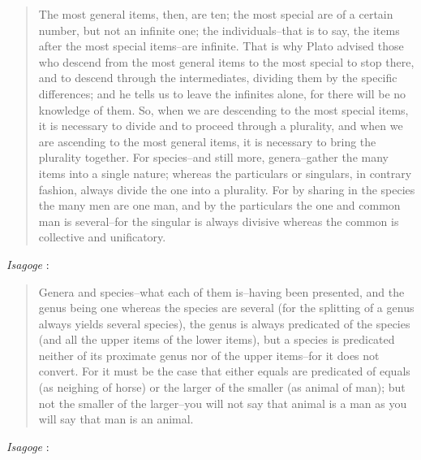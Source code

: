 \documentclass{article}
\begin{document}
\begin{quote}
The most general items, then, are ten; the most special are of a certain number, but not an infinite one; the individuals--that is to say, the items after the most special items--are infinite.
That is why Plato advised those who descend from the most general items to the most special to stop there, and to descend through the intermediates, dividing them by the specific differences; and he tells us to leave the infinites alone, for there will be no knowledge of them. So, when we are descending to the most special items, it is necessary to divide and to 
proceed through a plurality, and when we are ascending to the most general items, it is necessary to bring the plurality together. For species--and still more, genera--gather the many
items into a single nature; whereas the particulars or singulars, in contrary fashion, always divide the one into a plurality. For by sharing in the species the many men are one man, and by the particulars the one and common man is several--for the singular is always divisive whereas the common is collective and unificatory.
\end{quote}


{\em Isagoge} \cite[pp.~7--8, \S 2]{isagoge}:

\begin{quote}
Genera and species--what each of them is--having been presented, and the genus being one whereas the species are several (for the splitting of a genus always yields several species), the genus is always predicated of the species (and all the upper items of the lower items), but a species is predicated neither of its proximate genus nor of the upper items--for it does not convert. For it must be the case that either equals are predicated of equals (as neighing of horse) or the larger of the
smaller (as animal of man); but not the smaller of the larger--you will not say that animal is a man as you will say that man is an animal.
\end{quote}

{\em Isagoge} \cite[p.~8, \S 2]{isagoge}:
\end{document}
